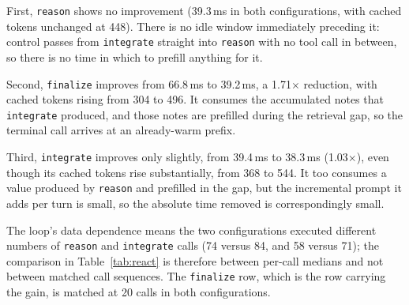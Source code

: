 First, \texttt{reason} shows no improvement (39.3\,ms in both configurations, with
cached tokens unchanged at 448). There is no idle window immediately preceding
it: control passes from \texttt{integrate} straight into \texttt{reason} with no
tool call in between, so there is no time in which to prefill anything for it.

Second, \texttt{finalize} improves from 66.8\,ms to 39.2\,ms, a 1.71$\times$
reduction, with cached tokens rising from 304 to 496. It consumes the accumulated
notes that \texttt{integrate} produced, and those notes are prefilled during the
retrieval gap, so the terminal call arrives at an already-warm prefix.

Third, \texttt{integrate} improves only slightly, from 39.4\,ms to 38.3\,ms
(1.03$\times$), even though its cached tokens rise substantially, from 368 to 544.
It too consumes a value produced by \texttt{reason} and prefilled in the gap, but
the incremental prompt it adds per turn is small, so the absolute time removed is
correspondingly small.

The loop's data dependence means the two configurations executed different
numbers of \texttt{reason} and \texttt{integrate} calls (74 versus 84, and 58
versus 71); the comparison in Table~\ref{tab:react} is therefore between
per-call medians and not between matched call sequences. The \texttt{finalize}
row, which is the row carrying the gain, is matched at 20 calls in both
configurations.
